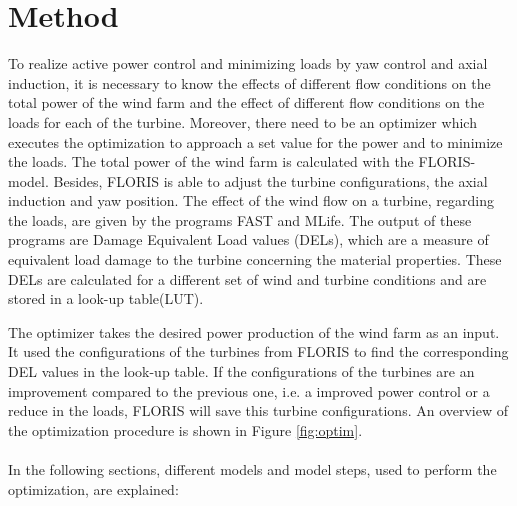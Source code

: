\section{Method}
\label{sec:method}

	To realize active power control and minimizing loads by yaw control and axial induction, it is necessary to know the effects of different flow conditions on the total power of the wind farm and the effect of different flow conditions on the loads for each of the turbine. Moreover, there need to be an optimizer which executes the optimization to approach a set value for the power and to minimize the loads.\newline
	The total power of the wind farm is calculated with the FLORIS-model. Besides, FLORIS is able to adjust the turbine configurations, the axial induction and yaw position.  
	The effect of the wind flow on a turbine, regarding the loads, are given by the programs FAST and MLife. The output of these programs are Damage Equivalent Load values (DELs), which are a measure of equivalent load damage to the turbine concerning the material properties.\cite{Chougule2016} These DELs are calculated for a different set of wind and turbine conditions and are stored in a look-up table(LUT).

	
	The optimizer takes the desired power production of the wind farm as an input. It used the configurations of the turbines from FLORIS to find the corresponding DEL values in the look-up table. If the configurations of the turbines are an improvement compared to the previous one, i.e. a improved power control or a reduce in the loads, FLORIS will save this turbine configurations. An overview of the optimization procedure is shown in Figure \ref{fig:optim}. 
	\\
	\\
	In the following sections, different models and model steps, used to perform the optimization, are explained:
	
	
	

